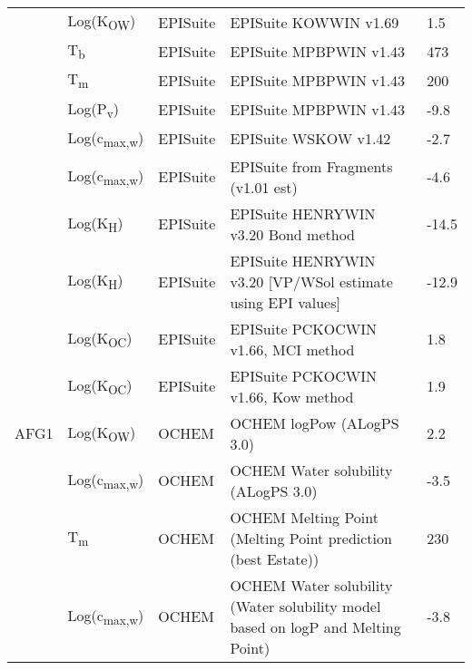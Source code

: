 \begin{landscape}
\begin{longtable}[c]{lllll}
          & Log(K\textsubscript{OW})      & EPISuite   & EPISuite KOWWIN v1.69                                                           & 1.5   \\
          & T\textsubscript{b}          & EPISuite   & EPISuite MPBPWIN v1.43                                                          & 473   \\
          & T\textsubscript{m}          & EPISuite   & EPISuite MPBPWIN v1.43                                                          & 200   \\
          & Log(P\textsubscript{v})       & EPISuite   & EPISuite MPBPWIN v1.43                                                          & -9.8  \\
          & Log(c\textsubscript{max,w}) & EPISuite   & EPISuite WSKOW v1.42                                                            & -2.7  \\
          & Log(c\textsubscript{max,w}) & EPISuite   & EPISuite from Fragments (v1.01 est)                                             & -4.6  \\
          & Log(K\textsubscript{H})       & EPISuite   & EPISuite HENRYWIN v3.20 Bond method                                             & -14.5 \\
          & Log(K\textsubscript{H})       & EPISuite   & EPISuite HENRYWIN v3.20 [VP/WSol estimate using EPI values]                     & -12.9 \\
          & Log(K\textsubscript{OC})      & EPISuite   & EPISuite PCKOCWIN v1.66, MCI method                                             & 1.8   \\
          & Log(K\textsubscript{OC})      & EPISuite   & EPISuite PCKOCWIN v1.66, Kow method                                             & 1.9   \\
          \hline
AFG1      & Log(K\textsubscript{OW})      & OCHEM      & OCHEM logPow (ALogPS 3.0)                                                       & 2.2   \\
          & Log(c\textsubscript{max,w}) & OCHEM      & OCHEM Water solubility (ALogPS 3.0)                                             & -3.5  \\
          & T\textsubscript{m}          & OCHEM      & OCHEM Melting Point (Melting Point prediction (best Estate))                    & 230   \\
          & Log(c\textsubscript{max,w}) & OCHEM      & OCHEM Water solubility (Water solubility model based on logP and Melting Point) & -3.8  \\

\end{longtable}
\end{landscape}

